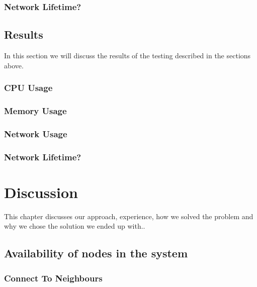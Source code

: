 \documentclass[USenglish]{uit-thesis}
\begin{document}
\subsection{Network Lifetime?}


\section{Results}
In this section we will discuss the results of the testing described in the sections above.

\subsection{CPU Usage}
\subsection{Memory Usage}
\subsection{Network Usage}
\subsection{Network Lifetime?}



\chapter{Discussion}
This chapter discusses our approach, experience, how we solved the problem and why we chose the solution we ended up with..

\section{Availability of nodes in the system}

\subsection{Connect To Neighbours} \label{disc:conn_neighbours}
\end{document}
